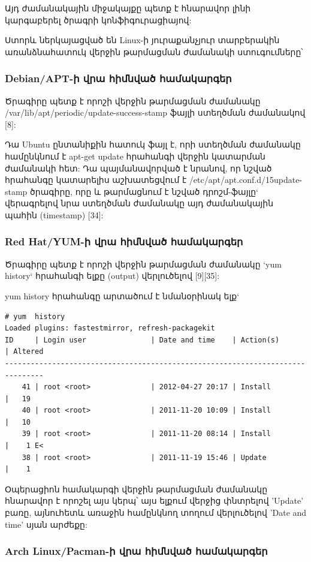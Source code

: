 \documentclass[a4paper,12pt]{article}
\begin{document}
\begin{sloppypar}
Այդ ժամանակային միջակայքը պետք է հնարավոր լինի կարգաբերել ծրագրի կոնֆիգուրացիայով:

Ստորև ներկայացված են Linux-ի յուրաքանչյուր տարբերակին առանձնահատուկ
վերջին թարմացման ժամանակի ստուգումները՝

\subsubsection{Debian/APT-ի վրա հիմնված համակարգեր}

Ծրագիրը պետք է որոշի վերջին թարմացման ժամանակը
/var/lib/apt/periodic/update-success-stamp
ֆայլի ստեղծման ժամանակով [8]:

Դա Ubuntu ընտանիքին հատուկ ֆայլ է, որի ստեղծման ժամանակը համընկնում է
apt-get update հրահանգի վերջին կատարման ժամանակի հետ: Դա պայմանավորված է
նրանով, որ նշված հրահանգը կատարելիս աշխատեցվում է
/etc/apt/apt.conf.d/15update-stamp
ծրագիրը, որը և թարմացնում է նշված դրոշմ-ֆայլը` վերագրելով նրա
ստեղծման ժամանակը այդ ժամանակային պահին (timestamp) [34]:

\subsubsection{Red Hat/YUM-ի վրա հիմնված համակարգեր}

Ծրագիրը պետք է որոշի վերջին թարմացման ժամանակը `yum history`
հրահանգի ելքը (output) վերլուծելով [9][35]:

yum history հրահանգը արտածում է նմանօրինակ ելք`

\begin{lstlisting}[language={}]
# yum  history
Loaded plugins: fastestmirror, refresh-packagekit
ID     | Login user               | Date and time    | Action(s)      | Altered
-------------------------------------------------------------------------------
    41 | root <root>              | 2012-04-27 20:17 | Install        |   19   
    40 | root <root>              | 2011-11-20 10:09 | Install        |   10   
    39 | root <root>              | 2011-11-20 08:14 | Install        |    1 E<
    38 | root <root>              | 2011-11-19 15:46 | Update         |    1 
\end{lstlisting}


Օպերացիոն համակարգի վերջին թարմացման ժամանակը հնարավոր է որոշել այս կերպ՝
այս ելքում վերջից փնտրելով 'Update' բառը, այնուհետև
առաջին համընկնող տողում վերլուծելով 'Date and time' սյան արժեքը:

\subsubsection{Arch Linux/Pacman-ի վրա հիմնված համակարգեր}


\end{sloppypar}
\end{document}
